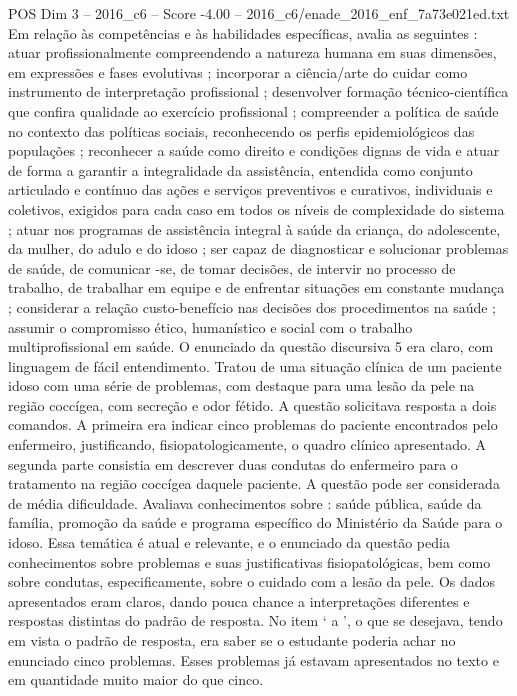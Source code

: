 \begin{textsample}{POS Dim 3 – 2016\_c6 – Score -4.00 – 2016\_c6/enade\_2016\_enf\_7a73e021ed.txt}
Em relação às competências e às habilidades específicas, avalia as seguintes : atuar profissionalmente compreendendo a natureza humana em suas dimensões, em expressões e fases evolutivas ; incorporar a ciência/arte do cuidar como instrumento de interpretação profissional ; desenvolver formação técnico-científica que confira qualidade ao exercício profissional ; compreender a política de saúde no contexto das políticas sociais, reconhecendo os perfis epidemiológicos das populações ; reconhecer a saúde como direito e condições dignas de vida e atuar de forma a garantir a integralidade da assistência, entendida como conjunto articulado e contínuo das ações e serviços preventivos e curativos, individuais e coletivos, exigidos para cada caso em todos os níveis de complexidade do sistema ; atuar nos programas de assistência integral à saúde da criança, do adolescente, da mulher, do adulo e do idoso ; ser capaz de diagnosticar e solucionar problemas de saúde, de comunicar -se, de tomar decisões, de intervir no processo de trabalho, de trabalhar em equipe e de enfrentar situações em constante mudança ; considerar a relação custo-benefício nas decisões dos procedimentos na saúde ; assumir o compromisso ético, humanístico e social com o trabalho multiprofissional em saúde.
O enunciado da questão discursiva 5 era claro, com linguagem de fácil entendimento.
Tratou de uma situação clínica de um paciente idoso com uma série de problemas, com destaque para uma lesão da pele na região coccígea, com secreção e odor fétido.
A questão solicitava resposta a dois comandos.
A primeira era indicar cinco problemas do paciente encontrados pelo enfermeiro, justificando, fisiopatologicamente, o quadro clínico apresentado.
A segunda parte consistia em descrever duas condutas do enfermeiro para o tratamento na região coccígea daquele paciente.
A questão pode ser considerada de média dificuldade.
Avaliava conhecimentos sobre : saúde pública, saúde da família, promoção da saúde e programa específico do Ministério da Saúde para o idoso.
Essa temática é atual e relevante, e o enunciado da questão pedia conhecimentos sobre problemas e suas justificativas fisiopatológicas, bem como sobre condutas, especificamente, sobre o cuidado com a lesão da pele.
Os dados apresentados eram claros, dando pouca chance a interpretações diferentes e respostas distintas do padrão de resposta.
No item ‘ a ’, o que se desejava, tendo em vista o padrão de resposta, era saber se o estudante poderia achar no enunciado cinco problemas.
Esses problemas já estavam apresentados no texto e em quantidade muito maior do que cinco.

\end{textsample}
